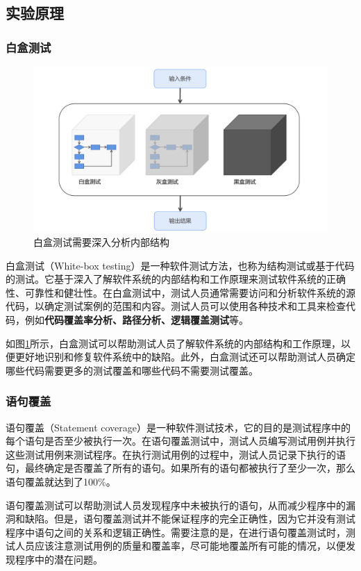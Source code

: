 \documentclass[12pt, a4paper, oneside,bibend=bibtex]{ctexart}
\begin{document}
\subsection{实验原理}
\subsubsection{白盒测试}
\begin{figure}[ht]
    \centering
    \includegraphics[width=1\linewidth]{images/white_test.pdf}
    \caption{白盒测试需要深入分析内部结构}
    \label{white}
\end{figure}
白盒测试（White-box testing）是一种软件测试方法，也称为结构测试或基于代码的测试。它基于深入了解软件系统的内部结构和工作原理来测试软件系统的正确性、可靠性和健壮性。在白盒测试中，测试人员通常需要访问和分析软件系统的源代码，以确定测试案例的范围和内容。测试人员可以使用各种技术和工具来检查代码，例如\textbf{代码覆盖率分析、路径分析、逻辑覆盖测试}等。

如图\ref{white}所示，白盒测试可以帮助测试人员了解软件系统的内部结构和工作原理，以便更好地识别和修复软件系统中的缺陷。此外，白盒测试还可以帮助测试人员确定哪些代码需要更多的测试覆盖和哪些代码不需要测试覆盖。
\subsubsection{语句覆盖}
语句覆盖（Statement coverage）是一种软件测试技术，它的目的是测试程序中的每个语句是否至少被执行一次。在语句覆盖测试中，测试人员编写测试用例并执行这些测试用例来测试程序。在执行测试用例的过程中，测试人员记录下执行的语句，最终确定是否覆盖了所有的语句。如果所有的语句都被执行了至少一次，那么语句覆盖就达到了100\%。

语句覆盖测试可以帮助测试人员发现程序中未被执行的语句，从而减少程序中的漏洞和缺陷。但是，语句覆盖测试并不能保证程序的完全正确性，因为它并没有测试程序中语句之间的关系和逻辑正确性。需要注意的是，在进行语句覆盖测试时，测试人员应该注意测试用例的质量和覆盖率，尽可能地覆盖所有可能的情况，以便发现程序中的潜在问题。
\end{document}
